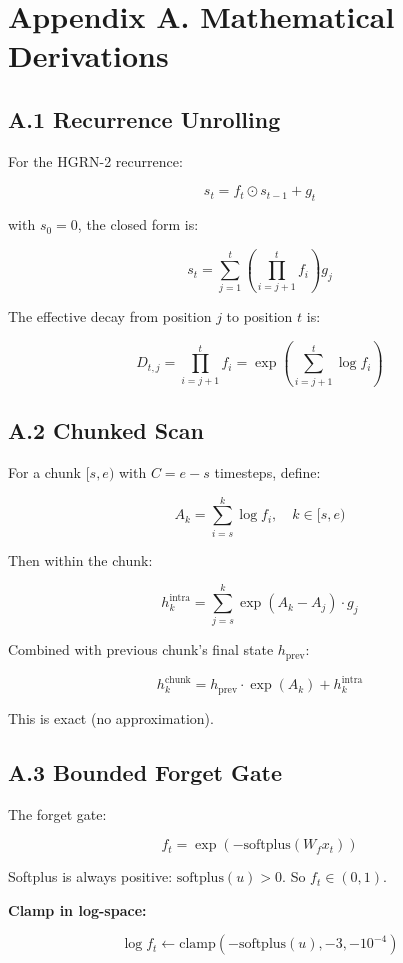 \section{Appendix A. Mathematical Derivations}

\subsection{A.1 Recurrence Unrolling}

For the HGRN-2 recurrence:

\[
s_t = f_t \odot s_{t-1} + g_t
\tag{A.1}
\]

with $s_0 = 0$, the closed form is:

\[
s_t = \sum_{j=1}^{t} \left( \prod_{i=j+1}^{t} f_i \right) g_j
\tag{A.2}
\]

The effective decay from position $j$ to position $t$ is:

\[
D_{t, j} = \prod_{i=j+1}^{t} f_i = \exp\left(\sum_{i=j+1}^{t} \log f_i\right)
\tag{A.3}
\]

\subsection{A.2 Chunked Scan}

For a chunk $[s, e)$ with $C = e - s$ timesteps, define:

\[
A_k = \sum_{i=s}^{k} \log f_i, \quad k \in [s, e)
\tag{A.4}
\]

Then within the chunk:

\[
h_k^\text{intra} = \sum_{j=s}^{k} \exp(A_k - A_j) \cdot g_j
\tag{A.5}
\]

Combined with previous chunk's final state $h_\text{prev}$:

\[
h_k^\text{chunk} = h_\text{prev} \cdot \exp(A_k) + h_k^\text{intra}
\tag{A.6}
\]

This is exact (no approximation).

\subsection{A.3 Bounded Forget Gate}

The forget gate:

\[
f_t = \exp(-\text{softplus}(W_f x_t))
\tag{A.7}
\]

Softplus is always positive: $\text{softplus}(u) > 0$. So $f_t \in (0, 1)$.

\textbf{Clamp in log-space:}

\[
\log f_t \leftarrow \text{clamp}(- \text{softplus}(u), -3, -10^{-4})
\tag{A.8}
\]

